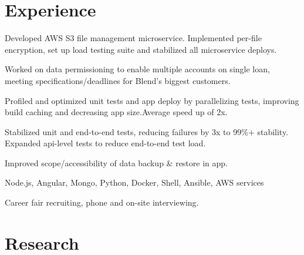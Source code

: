 \documentclass[]{yubo-resume-openfont}
\begin{document}
\begin{minipage}[t]{0.33\textwidth}
%
%

\end{minipage}
\hfill
\begin{minipage}[t]{0.66\textwidth}


\section{Experience}

\vspace{\topsep} %
\begin{tightemize}
    \item Developed AWS S3 file management microservice. Implemented per-file
        encryption, set up load testing suite and stabilized all microservice
        deploys.
    \item Worked on data permissioning to enable multiple accounts on single
        loan, meeting specifications/deadlines for Blend's biggest customers.
    \item Profiled and optimized unit tests and app deploy by parallelizing
        tests, improving build caching and decreasing app size.\@ Average speed
        up of 2x.
    \item Stabilized unit and end-to-end tests, reducing failures by 3x to 99\%+
        stability. Expanded api-level tests to reduce end-to-end test load.
    \item Improved scope/accessibility of data backup \& restore in app.
    \item Node.js, Angular, Mongo, Python, Docker, Shell, Ansible, AWS services
    \item Career fair recruiting, phone and on-site interviewing.
\end{tightemize}
\sectionsep


\section{Research}

\end{minipage}
\end{document}
